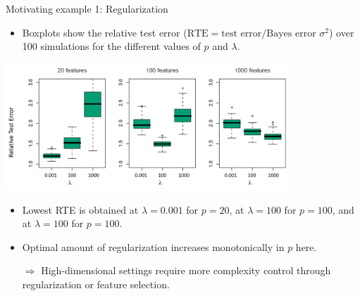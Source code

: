 \documentclass[11pt,compress,t,notes=noshow, xcolor=table]{beamer}
\begin{document}
\begin{vbframe}{Motivating example 1: Regularization}
  \begin{itemize}
  \small
    \item Boxplots show the relative test error ($\text{RTE} = \text{test error} / \text{Bayes error }\sigma^2$) over 100 simulations for the different values of $p$ and $\lambda$.
  \normalsize
  \end{itemize}
  \begin{center}
  \includegraphics[width = 0.8\textwidth]{figure_man/tibshirani_fig_18_1_mod.png}
  \end{center}
  \vspace{-0.3cm}
  \begin{itemize}\small
  \item Lowest RTE is obtained at $\lambda = 0.001$  for $p=20$, %
  at $\lambda = 100$ for $p=100$, %
  and at $\lambda = 100$ for $p=100$.%
 \item Optimal amount of regularization increases monotonically in $p$ here.
  \item[$\Rightarrow$] High-dimensional settings require more complexity control through regularization or feature selection.
  \end{itemize}
  \end{vbframe}
\end{document}
